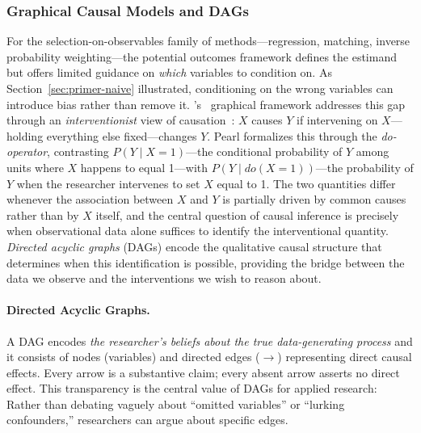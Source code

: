 \subsubsection{Graphical Causal Models and DAGs}
\label{sec:primer-dags}

For the selection-on-observables family of methods---regression, matching, inverse probability weighting---the potential outcomes framework defines the estimand but offers limited guidance on \emph{which} variables to condition on.
As Section~\ref{sec:primer-naive} illustrated, conditioning on the wrong variables can introduce bias rather than remove it.
\citeauthor{pearl2009causality}'s~\cite{pearl2009causality} graphical framework addresses this gap through an \emph{interventionist} view of causation~\cite{woodward2003making}: $X$ causes $Y$ if intervening on $X$---holding everything else fixed---changes $Y$.
Pearl formalizes this through the \emph{do-operator}, contrasting $P(Y \mid X\!=\!1)$---the conditional probability of $Y$ among units where $X$ happens to equal 1---with $P(Y \mid do(X\!=\!1))$---the probability of $Y$ when the researcher intervenes to set $X$ equal to 1.
The two quantities differ whenever the association between $X$ and $Y$ is partially driven by common causes rather than by $X$ itself, and the central question of causal inference is precisely when observational data alone suffices to identify the interventional quantity.
\emph{Directed acyclic graphs} (DAGs) encode the qualitative causal structure that determines when this identification is possible, providing the bridge between the data we observe and the interventions we wish to reason about.

\paragraph{Directed Acyclic Graphs.}
A DAG encodes \emph{the researcher's beliefs about the true data-generating process} and it consists of nodes (variables) and directed edges ($\to$) representing direct causal effects.
Every arrow is a substantive claim; every absent arrow asserts no direct effect.
This transparency is the central value of DAGs for applied research: Rather than debating vaguely about ``omitted variables'' or ``lurking confounders,'' researchers can argue about specific edges.

